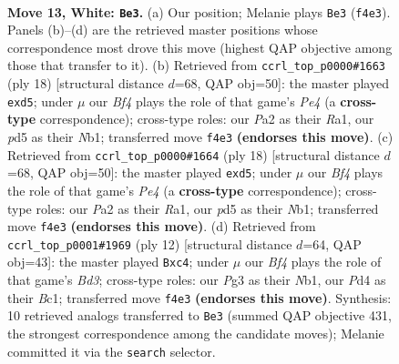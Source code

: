 \documentclass[11pt]{article}
\begin{document}
\clearpage

\begin{figure}[p]\centering
\begin{subfigure}{0.46\textwidth}\centering
\resizebox{\linewidth}{!}{%
\newchessgame
\chessboard[
  setfen={rnbqr1k1/p5pp/2pb1n2/1p1p1p2/3P1B2/5NP1/PPQ1PPBP/RN3RK1 w - - 6 13},
  showmover=false,
  pgfstyle=straightmove, color=movearrow, markmove={f4-e3}
]}
\caption{}
\end{subfigure}\hfill
\begin{subfigure}{0.46\textwidth}\centering
\resizebox{\linewidth}{!}{%
\newchessgame
\chessboard[
  setfen={rnbqk2r/pp2ppbp/2n3p1/3p4/4P3/P5P1/1P2NPBP/RNBQK2R w KQkq - 1 10},
  showmover=false,
  pgfstyle=straightmove, color=movearrow, markmove={e4-d5}
]}
\caption{}
\end{subfigure}
\\[4pt]
\begin{subfigure}{0.46\textwidth}\centering
\resizebox{\linewidth}{!}{%
\newchessgame
\chessboard[
  setfen={rnbqk2r/pp2ppbp/2n3p1/3p4/4P3/P5P1/1P2NPBP/RNBQK2R w KQkq - 1 10},
  showmover=false,
  pgfstyle=straightmove, color=movearrow, markmove={e4-d5}
]}
\caption{}
\end{subfigure}\hfill
\begin{subfigure}{0.46\textwidth}\centering
\resizebox{\linewidth}{!}{%
\newchessgame
\chessboard[
  setfen={rn1qkb1r/pbp2ppp/1p2pn2/8/2pP4/3BPN2/PP3PPP/RNBQ1RK1 w kq - 0 7},
  showmover=false,
  pgfstyle=straightmove, color=movearrow, markmove={d3-c4}
]}
\caption{}
\end{subfigure}
\caption{\textbf{Move 13, White: \texttt{Be3}.} (a) Our position; Melanie plays \texttt{Be3} (\texttt{f4e3}). Panels (b)--(d) are the retrieved master positions whose correspondence most drove this move (highest QAP objective among those that transfer to it). (b) Retrieved from \texttt{ccrl\_top\_p0000\#1663} (ply 18) [structural distance $d$=68, QAP obj=50]: the master played \texttt{exd5}; under $\mu$ our \emph{Bf4} plays the role of that game's \emph{Pe4} (a \textbf{cross-type} correspondence); cross-type roles: our \emph{P}a2 as their \emph{R}a1, our \emph{p}d5 as their \emph{N}b1; transferred move \texttt{f4e3} \textbf{(endorses this move)}. (c) Retrieved from \texttt{ccrl\_top\_p0000\#1664} (ply 18) [structural distance $d$=68, QAP obj=50]: the master played \texttt{exd5}; under $\mu$ our \emph{Bf4} plays the role of that game's \emph{Pe4} (a \textbf{cross-type} correspondence); cross-type roles: our \emph{P}a2 as their \emph{R}a1, our \emph{p}d5 as their \emph{N}b1; transferred move \texttt{f4e3} \textbf{(endorses this move)}. (d) Retrieved from \texttt{ccrl\_top\_p0001\#1969} (ply 12) [structural distance $d$=64, QAP obj=43]: the master played \texttt{Bxc4}; under $\mu$ our \emph{Bf4} plays the role of that game's \emph{Bd3}; cross-type roles: our \emph{P}g3 as their \emph{N}b1, our \emph{P}d4 as their \emph{B}c1; transferred move \texttt{f4e3} \textbf{(endorses this move)}. Synthesis: 10 retrieved analogs transferred to \texttt{Be3} (summed QAP objective 431, the strongest correspondence among the candidate moves); Melanie committed it via the \texttt{search} selector.}
\label{fig:thought-m24}
\end{figure}
\end{document}
